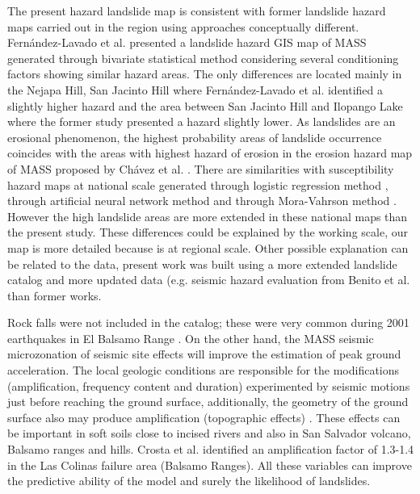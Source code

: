 \documentclass[11pt,twoside]{rmta2010esp}%
\begin{document}
The present hazard landslide map is consistent with former landslide hazard maps carried out in the region using approaches conceptually different. Fern\'{a}ndez-Lavado et al.\cite{fernan2008} presented a landslide hazard GIS map of MASS generated through bivariate statistical method considering several conditioning factors showing similar hazard areas. The only differences are located mainly in the Nejapa Hill, San Jacinto Hill where Fern\'{a}ndez-Lavado et al. \cite{fernan2008} identified a slightly higher hazard and the area between San Jacinto Hill and Ilopango Lake where the former study presented a hazard slightly lower. As landslides are an erosional phenomenon, the highest probability areas of landslide occurrence coincides with the areas with highest hazard of erosion in the erosion hazard map of MASS proposed by Ch\'{a}vez et al. \cite{chavez2014a}. There are similarities with susceptibility hazard maps at national scale generated through logistic regression method \cite{garcia2008}, through artificial neural network method \cite{garcia2010} and through Mora-Vahrson method \cite{snet2004}. However the high landslide areas are more extended in these national maps than the present study. These differences could be explained by the working scale, our map is more detailed because is at regional scale. Other possible explanation can be related to the data, present work was built using a more extended landslide catalog and more updated data (e.g. seismic hazard evaluation from Benito et al. \cite{beni2012} than former works.

Rock falls were not included in the catalog; these were very common during 2001 earthquakes in El Balsamo Range \cite{jibson}. On the other hand, the MASS seismic microzonation of seismic site effects will improve the estimation of peak ground acceleration. The local geologic conditions are responsible for the modifications (amplification, frequency content and duration) experimented by seismic motions just before reaching the ground surface, additionally, the geometry of the ground surface also may produce amplification (topographic effects) \cite{aki1993}. These effects can be important in soft soils close to incised rivers and also in San Salvador volcano, Balsamo ranges and hills. Crosta et al. \cite{crosta2005} identified an amplification factor of 1.3-1.4 in the Las Colinas failure area (Balsamo Ranges). All these variables can improve the predictive ability of the model and surely the likelihood of landslides.
\end{document}
